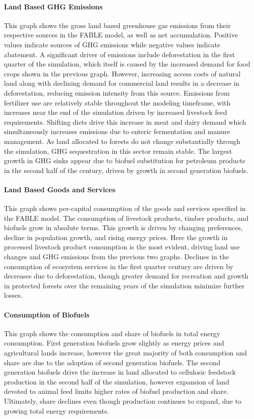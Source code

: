 \documentclass[10pt]{article}
\begin{document}
\paragraph{Land Based GHG Emissions} This graph shows the gross land based greenhouse gas emissions from their respective sources in the FABLE model, as well as net accumulation. Positive values indicate sources of GHG emissions while negative values indicate abatement. A significant driver of emissions include deforestation in the first quarter of the simulation, which itself is caused by the increased demand for food crops shown in the previous graph. However, increasing access costs of natural land along with declining demand for commercial land results in a decrease in deforestation, reducing emission intensity from this source. Emissions from fertilizer use are relatively stable throughout the modeling timeframe, with increases near the end of the simulation driven by increased livestock feed requirements. Shifting diets drive this increase in meat and dairy demand which simultaneously increases emissions due to enteric fermentation and manure management. As land allocated to forests do not change substantially through the simulation, GHG sequestration in this sector remain stable. The largest growth in GHG sinks appear due to biofuel substitution for petroleum products in the second half of the century, driven by growth in second generation biofuels. 

\paragraph{Land Based Goods and Services} This graph shows per-capital consumption of the goods and services specified in the FABLE model. The consumption of livestock products, timber products, and biofuels grow in absolute terms. This growth is driven by changing preferences, decline in population growth, and rising energy prices. Here the growth in processed livestock product consumption is the most evident, driving land use changes and GHG emissions from the previous two graphs. Declines in the consumption of ecosystem services in the first quarter century are driven by decreases due to deforestation, though greater demand for recreation and growth in protected forests over the remaining years of the simulation minimize further losses. 

\paragraph{Consumption of Biofuels} This graph shows the consumption and share of biofuels in total energy consumption. First generation biofuels grow slightly as energy prices and agricultural lands increase, however the great majority of both consumption and share are due to the adoption of second generation biofuels. The second generation biofuels drive the  increase in land allocated to cellulosic feedstock production in the second half of the simulation, however expansion of land devoted to animal feed limits higher rates of biofuel production and share. Ultimately, share declines even though production continues to expand, due to growing total energy requirements. 
\end{document}
